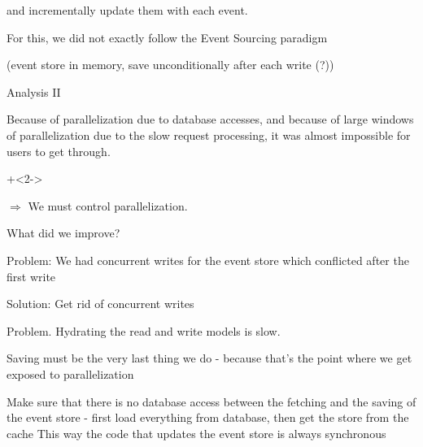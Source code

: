 \begin{frame}[fragile]{}




 and incrementally update them with each event.


For this, we did not exactly follow the Event Sourcing paradigm

(event store in memory, save unconditionally after each write (?))

\end{frame}






\begin{frame}[fragile]{Analysis II}

Because of parallelization due to database accesses, and because of large windows of parallelization due to the slow request processing, it was almost impossible for users to get through.

\onslide+<2->
                  
\vspace{3em}

$\Longrightarrow$ We must control parallelization.
                  
\end{frame}

\begin{frame}[fragile]{What did we improve?}

Problem: We had concurrent writes for the event store which conflicted after the first write

Solution: Get rid of concurrent writes

Problem. Hydrating the read and write models is slow.


Saving must be the very last thing we do - because that's the point where we get exposed to parallelization

Make sure that there is no database access between the fetching and the saving of the event store - first load everything from database, then get the store from the cache
This way the code that updates the event store is always synchronous


\end{frame}

